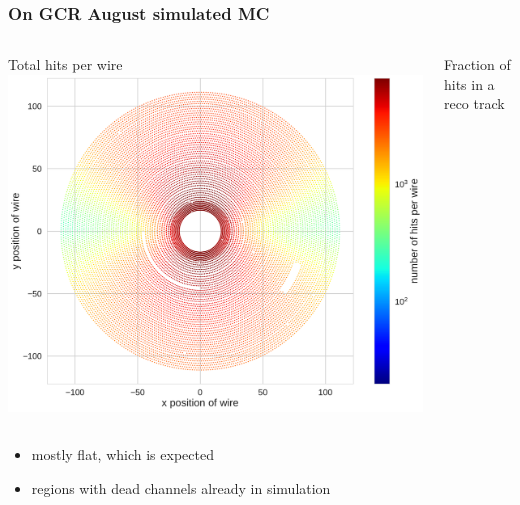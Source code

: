 \documentclass[18pt]{beamer}
\begin{document}
\begin{frame}
  \frametitle{On GCR August simulated MC}
  \begin{columns}
    \begin{column}{0.5\textwidth}
      \centering
      Total hits per wire
      \includegraphics[width=1.\textwidth]{figures/hit_efficiency_by_wire/total_hits_per_wire_MC.pdf}
    \end{column}
    \begin{column}{0.5\textwidth}
      \centering
      Fraction of hits in a reco track
    \end{column}
  \end{columns}
  \begin{itemize}
  \item mostly flat, which is expected
  \item regions with dead channels already in simulation
  \end{itemize}
\end{frame}
\end{document}
